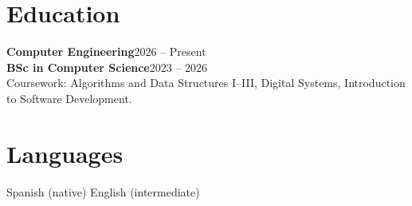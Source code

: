 \documentclass[10pt,a4paper]{article}
\begin{document}
\section{Education}
\textbf{Computer Engineering}\hfill{\small\color{muted}2026 -- Present}\\[2pt]
\textbf{BSc in Computer Science}\hfill{\small\color{muted}2023 -- 2026}\\[2pt]
{\small Coursework: Algorithms and Data Structures I--III, Digital Systems, Introduction to Software Development.}

\section{Languages}
Spanish (native) \quad\textperiodcentered\quad English (intermediate)
\end{document}
